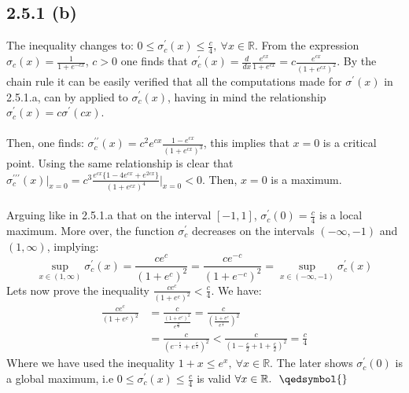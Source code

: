 \documentclass{exam}
\begin{document}
\subsection*{2.5.1 (b)}
The inequality changes to: $ 0 \leq \sigma^\prime_c(x) \leq \frac{c}{4}, \ \forall x \in \mathbb{R}$. From the expression $\sigma_c(x) = \frac{1}{1 + e^{-cx}}$, $c > 0$ one finds that $\sigma^{\prime}_c(x) = \frac{d}{d x} \frac{e^{cx}}{1 + e^{cx}} = \displaystyle c \frac{e^{cx}}{(1 + e^{cx})^2}$. By the chain rule it can be easily verified that all the computations 
made for $\sigma^{\prime}(x)$ in 2.5.1.a, can by applied to $\sigma^{\prime}_c(x)$, having in mind the relationship $\sigma^{\prime}_c(x) = c \sigma^{\prime}(cx)$. \\
\\
Then, one finds: $\sigma^{\prime\prime}_c(x) = c^{2} e^{cx}\frac{1-e^{cx}}{(1 + e^{cx})^3}$, this implies that $x=0$ is a critical point. Using the same relationship is clear that $\sigma^{\prime\prime\prime}_c(x) \Big|_{x=0} = c^{3}\frac{e^{cx} \{ 1 - 4e^{cx} + e^{2cx} \}}{(1 + e^{cx})^{4}} \Big|_{x=0} < 0$. Then, $x=0$ is a maximum. \\
\\
Arguing like in 2.5.1.a that on the interval $[-1,1]$, $\sigma^{\prime}_c(0) = \frac{c}{4}$ is a local maximum. More over, the function $\sigma^\prime_c$ decreases on the intervals
$(-\infty,-1)$ and $(1, \infty)$, implying: \newline
\begin{equation*}
    \displaystyle\sup_{x \in (1,\infty)}\sigma^{\prime}_c(x) = \displaystyle\frac{ce^{c}}{(1 + e^{c})^2} = \displaystyle\frac{ce^{-c}}{(1 + e^{-c})^2} = \sup_{x \in (-\infty,-1)} \sigma^{\prime}_c(x)
\end{equation*}
\newline
Lets now prove the inequality $ \displaystyle\frac{ce^{c}}{(1 + e^{c})^2} < \frac{c}{4}$. We have: 
\begin{equation*}
    \begin{aligned}
        \displaystyle\frac{ce^{c}}{(1 + e^{c})^2} &= \displaystyle\frac{c}{\frac{(1 + e^{c})^2}{\displaystyle e^{\frac{2c}{2}}}} = \displaystyle\frac{c}{(\frac{1 + e^{c}}{\displaystyle e^{\frac{c}{2}}})^2}\\
        &= \displaystyle \frac{c}{(e^{-\frac{c}{2}} + e^{\frac{c}{2}})^2} < \displaystyle \frac{c}{(1 - \frac{c}{2} + 1 + \frac{c}{2})^2} = \frac{c}{4}
    \end{aligned}
\end{equation*}
Where we have used the inequality $1 + x \leq e^x, \ \forall x \in \mathbb{R}$. The later shows $\sigma^{\prime}_c(0)$ is a global maximum, \newline 
i.e $0 \leq \sigma^\prime_c(x) \leq \frac{c}{4}$ is valid $\forall x \in \mathbb{R}. \text{ \ \qedsymbol{}}$
\end{document}
